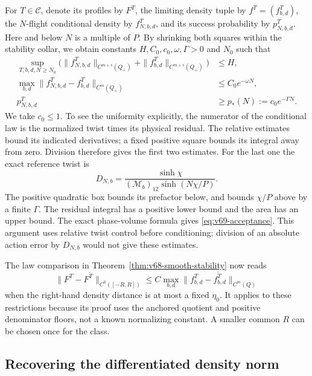 For $T\in\mathscr C$, denote its profiles by $F^T$, the limiting
density tuple by $f^T=(f^T_{b,d})$, the $N$-flight conditional density
by $f^T_{N,b,d}$, and its success probability by $p^T_{N,b,d}$.
Here and below $N$ is a multiple of $P$.  By shrinking both squares
within the stability collar, we obtain constants
$H,C_0,c_0,\omega,\Gamma>0$ and $N_0$ such that
\begin{align}
 \sup_{T,b,d,N\ge N_0}
 \bigl(\|f^T_{N,b,d}\|_{C^{m+s}(Q_+)}+
       \|f^T_{b,d}\|_{C^{m+s}(Q_+)}\bigr)&\le H,
       \label{eq:v69-forward-smoothness}\\
 \max_{b,d}\|f^T_{N,b,d}-f^T_{b,d}\|_{C^m(Q_+)}
                         &\le C_0e^{-\omega N},
       \label{eq:v69-forward-error}\\
 p^T_{N,b,d}&\ge p_*(N):=c_0e^{-\Gamma N}.
       \label{eq:v69-acceptance}
\end{align}
We take $c_0\le1$.  To see the uniformity explicitly, the numerator
of the conditional law is the normalized twist times its physical
residual.  The relative estimates bound its indicated derivatives;
a fixed positive square bounds its integral away from zero.  Division
therefore gives the first two estimates.  For the last one the exact
reference twist is
\[
 D_{N,b}=
 \frac{\sinh\chi}{(\mathcal M_b)_{12}\sinh(N\chi/P)}.
\]
The positive quadratic box bounds its prefactor below, and bounds
$\chi/P$ above by a finite $\Gamma$.  The residual integral has a
positive lower bound and the area has an upper bound.  The exact
phase-volume formula gives \eqref{eq:v69-acceptance}.  This argument
uses relative twist control before conditioning; division of an
absolute action error by $D_{N,b}$ would not give these estimates.

The law comparison in Theorem~\ref{thm:v68-smooth-stability} now reads
\begin{equation}\label{eq:v69-realizable-comparison}
 \|F^T-F^{\widetilde T}\|_{C^0([-R,R])}
 \le C\max_{b,d}\|f^T_{b,d}-f^{\widetilde T}_{b,d}\|_{C^m(Q)}
\end{equation}
when the right-hand density distance is at most a fixed $\eta_0$.
It applies to these restrictions because its proof uses the anchored
quotient and positive denominator floors, not a known normalizing
constant.  A smaller common $R$ can be chosen once for the class.

\subsection{Recovering the differentiated density norm}

